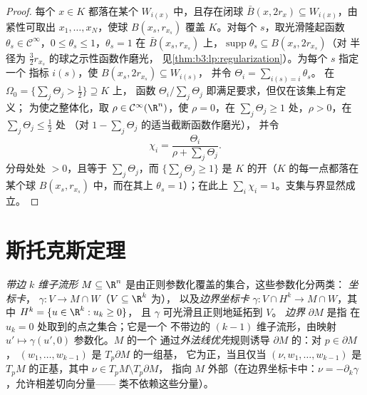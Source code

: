 \begin{proof}
每个 $x \in K$ 都落在某个 $W_{i(x)}$ 中，且存在闭球
$\bar B(x, 2r_x) \subseteq W_{i(x)}$，由紧性可取出
$x_1, \dots, x_N$，使球 $B(x_s, r_{x_s})$ 覆盖
$K$。对每个 $s$，取光滑隆起函数 $\theta_s \in \mathcal
C^\infty$，$0 \leq \theta_s \leq 1$，$\theta_s = 1$ 在
$\bar B(x_s, r_{x_s})$ 上，$\operatorname{supp}\theta_s
\subseteq B(x_s, 2r_{x_s})$（对
半径为 $\frac32r_{x_s}$ 的球之示性函数作磨光，
见\cref{thm:b3:lp:regularization}）。为每个 $s$ 指定一个
指标 $i(s)$，使 $B(x_s, 2r_{x_s}) \subseteq W_{i(s)}$，
并令 $\Theta_i = \sum_{i(s) = i}\theta_s$。
在 $\Omega_0 = \{\sum_j\Theta_j > \tfrac12\} \supseteq K$ 上，
函数 $\Theta_i/\sum_j\Theta_j$ 即满足要求，但仅在该集上有定义；
为使之整体化，取 $\rho \in \mathcal
C^\infty(\R^n)$，使 $\rho = 0$，在 $\sum_j\Theta_j
\geq 1$ 处，$\rho > 0$，在 $\sum_j\Theta_j \leq \tfrac12$ 处
（对 $1 - \sum_j\Theta_j$ 的适当截断函数作磨光），
并令
\[
\chi_i = \frac{\Theta_i}{\rho + \sum_j\Theta_j} .
\]
分母处处 $> 0$，且等于
$\sum_j\Theta_j$，而 $\{\sum_j\Theta_j \geq 1\}$ 是
$K$ 的开（$K$ 的每一点都落在某个球
$B(x_s, r_{x_s})$ 中，而在其上 $\theta_s = 1$）；在此上
$\sum_i\chi_i = 1$。支集与界显然成立。
\end{proof}

\section{斯托克斯定理}

\begin{definition}\label{def:b3:forms:boundary}
\emph{带边 $k$ 维子流形}
$M \subseteq \R^n$ 是由正则参数化覆盖的集合，这些参数化分两类：
\emph{坐标卡}，
$\gamma\colon V \to M \cap W$（$V \subseteq \R^k$ 为），
以及\emph{边界坐标卡} $\gamma\colon V \cap H^k \to M
\cap W$，其中 $H^k = \{u \in \R^k : u_k \geq 0\}$，
且 $\gamma$ 可光滑且正则地延拓到 $V$。
\emph{边界} $\partial M$ 是指
在 $u_k = 0$ 处取到的点之集合；它是一个
不带边的 $(k-1)$ 维子流形，由映射 $u' \mapsto \gamma(u',
0)$ 参数化。$M$ 的一个
通过\emph{外法线优先}规则诱导 $\partial M$ 的：对 $p \in \partial M$，
$(w_1, \dots, w_{k-1})$ 是 $T_p\partial M$ 的一组基，
它为正，当且仅当 $(\nu, w_1, \dots, w_{k-1})$ 是
$T_pM$ 的正基，其中 $\nu \in T_pM \setminus T_p\partial M$，
指向 $M$ 外部（在边界坐标卡中：$\nu =
-\partial_k\gamma$，允许相差切向分量——
类不依赖这些分量）。
\end{definition}

